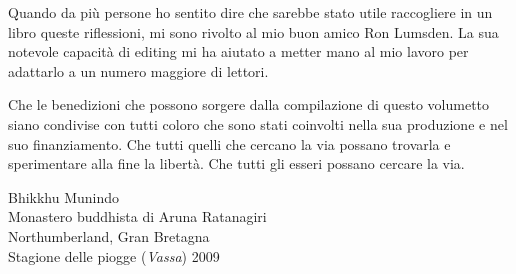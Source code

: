 Quando da più persone ho sentito dire che sarebbe stato utile
raccogliere in un libro queste riflessioni, mi sono rivolto al mio buon
amico Ron Lumsden. La sua notevole capacità di editing mi ha aiutato a
metter mano al mio lavoro per adattarlo a un numero maggiore di lettori.

Che le benedizioni che possono sorgere dalla compilazione di questo
volumetto siano condivise con tutti coloro che sono stati coinvolti
nella sua produzione e nel suo finanziamento. Che tutti quelli che
cercano la via possano trovarla e sperimentare alla fine la libertà. Che
tutti gli esseri possano cercare la via.

\bigskip

{\par\raggedleft
Bhikkhu Munindo\\
Monastero buddhista di Aruna Ratanagiri\\
Northumberland, Gran Bretagna\\
Stagione delle piogge (\emph{Vassa}) 2009
\par}
